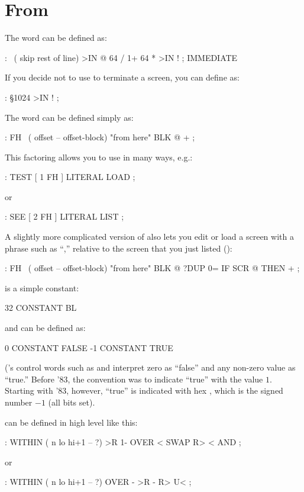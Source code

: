 \section{From }

The word \forthb{\bs} can be defined as:
\begin{Code}
: \  ( skip rest of line)
     >IN @  64 / 1+  64 *  >IN ! ; IMMEDIATE
\end{Code}
If you decide not to use  to terminate a screen, you can
define  as:
\begin{Code}
: \S   1024 >IN ! ;
\end{Code}
%
The word  can be defined simply as:
\begin{Code}
: FH   \   ( offset -- offset-block)   "from here"
    BLK @ + ;
\end{Code}
This factoring allows you to use  in many ways, e.g.:
\begin{Code}
: TEST   [ 1 FH ] LITERAL LOAD ;
\end{Code}
or
\begin{Code}
: SEE   [ 2 FH ] LITERAL LIST ;
\end{Code}
A slightly more complicated version of  also lets you edit or
load a screen with a phrase such as ``,'' relative to
the screen that you just listed ():
\begin{Code}
: FH   \   ( offset -- offset-block)   "from here"
     BLK @  ?DUP 0= IF  SCR @  THEN  + ;
\end{Code}
 is a simple constant:
\begin{Code}
32 CONSTANT BL
\end{Code}
 and 
can be defined as:
\begin{Code}
0 CONSTANT FALSE
-1 CONSTANT TRUE
\end{Code}
(\Forth{}'s control words such as  and  interpret
zero as ``false'' and any non-zero value as ``true.''  Before \Forth{}
'83, the convention was to indicate ``true'' with the value $1$.  Starting
with \Forth{} '83, however, ``true'' is indicated with hex ,
which is the signed number $-1$ (all bits set).

 can be defined in high level like this:
\begin{Code}
: WITHIN  ( n lo hi+1 -- ?)
     >R  1- OVER <  SWAP R>  < AND ;
\end{Code}
or
\begin{Code}
: WITHIN ( n lo hi+1 -- ?)
   OVER -  >R - R> U< ;
\end{Code}

